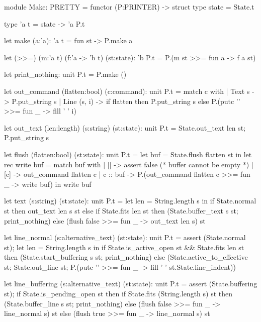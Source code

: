 \documentclass[12pt]{article}
\begin{document}
\begin{ocaml}
module Make: PRETTY
  =
  functor (P:PRINTER) ->
  struct
    type state = State.t

    type 'a t = state -> 'a P.t

    let make (a:'a): 'a t = fun st -> P.make a

    let (>>=) (m:'a t) (f:'a -> 'b t) (st:state): 'b P.t =
      P.(m st >>= fun a -> f a st)

    let print_nothing: unit P.t = P.make ()

    let out_command (flatten:bool) (c:command): unit P.t =
      match c with
      | Text s ->
         P.put_string  s
      | Line (s, i) ->
         if flatten then
           P.put_string s
         else
           P.(putc '\n' >>= fun _ -> fill ' ' i)

    let out_text (len:length) (s:string) (st:state): unit P.t =
      State.out_text len st; P.put_string s


    let flush (flatten:bool) (st:state): unit P.t =
      let buf = State.flush flatten st in
      let rec write buf =
        match buf with
        | [] ->
           assert false (* buffer cannot be empty *)
        | [c] ->
           out_command flatten c
        | c :: buf ->
           P.(out_command flatten c >>= fun _ -> write buf)
      in
      write buf

    let text (s:string) (st:state): unit P.t =
      let len = String.length s
      in
      if State.normal st then
        out_text len s st
      else if State.fits len st then
        (State.buffer_text s st; print_nothing)
      else
        (flush false >>= fun _ -> out_text len s) st

    let line_normal (s:alternative_text) (st:state): unit P.t =
      assert (State.normal st);
      let len = String.length s
      in
      if State.is_active_open st && State.fits len st then
        (State.start_buffering s st; print_nothing)
      else
        (State.active_to_effective st;
         State.out_line st;
         P.(putc '\n' >>= fun _ ->
            fill ' ' st.State.line_indent))

    let line_buffering (s:alternative_text) (st:state): unit P.t =
      assert (State.buffering st);
      if State.is_pending_open st then
        if State.fits (String.length s) st then
          (State.buffer_line s st; print_nothing)
        else
          (flush false >>= fun _ -> line_normal s) st
      else
        (flush true >>= fun _ -> line_normal s) st


\end{ocaml}
\end{document}
